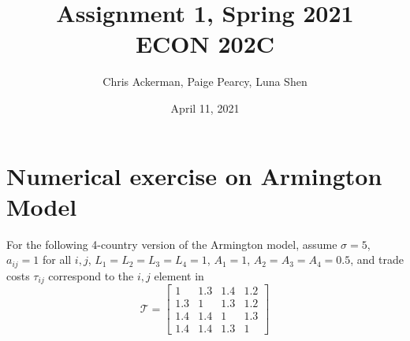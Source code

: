 \documentclass{article}
\title{Assignment 1, Spring 2021\\ \normalsize{ECON 202C}}
\author{Chris Ackerman, Paige Pearcy, Luna Shen}
\date{April 11, 2021}
\begin{document}
	\maketitle
	
\section{Numerical exercise on Armington Model}
For the following 4-country version of the Armington model, assume $\sigma = 5$, $a_{ij}=1$ for all $i,j$, $L_1= L_2 = L_3=L_4=1$, $A_1=1$, $A_2=A_3=A_4=0.5$, and trade costs $\tau_{ij}$ correspond to the $i,j$ element in 
\[
\mathcal{T} = 
\begin{bmatrix}
1 & 1.3 & 1.4 & 1.2 \\
1.3 & 1 & 1.3 & 1.2 \\
1.4 & 1.4 & 1 & 1.3 \\
1.4 & 1.4 & 1.3 & 1
\end{bmatrix} 
\]
\end{document}
